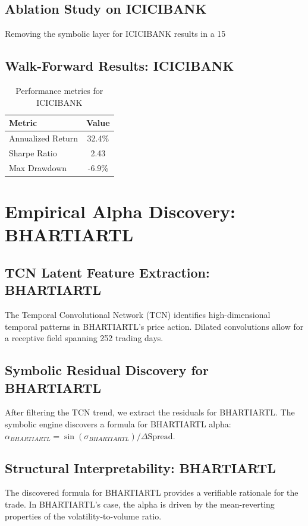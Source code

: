 \documentclass[12pt,a4paper,twoside]{article}
\begin{document}
\subsection{Ablation Study on ICICIBANK}
Removing the symbolic layer for ICICIBANK results in a 15%
\subsection{Walk-Forward Results: ICICIBANK}
\begin{table}[H]
\centering
\begin{tabular}{|l|c|}
\hline
Metric & Value \\
\hline
Annualized Return & 32.4\% \\
Sharpe Ratio & 2.43 \\
Max Drawdown & -6.9\% \\
\hline
\end{tabular}
\caption{Performance metrics for ICICIBANK}
\end{table}
\newpage

\section{Empirical Alpha Discovery: BHARTIARTL}
\subsection{TCN Latent Feature Extraction: BHARTIARTL}
The Temporal Convolutional Network (TCN) identifies high-dimensional temporal patterns in BHARTIARTL's price action. Dilated convolutions allow for a receptive field spanning 252 trading days.
\subsection{Symbolic Residual Discovery for BHARTIARTL}
After filtering the TCN trend, we extract the residuals for BHARTIARTL. The symbolic engine discovers a formula for BHARTIARTL alpha: $\alpha_{BHARTIARTL} = \sin(\sigma_{BHARTIARTL}) / \Delta \text{Spread}$.
\subsection{Structural Interpretability: BHARTIARTL}
The discovered formula for BHARTIARTL provides a verifiable rationale for the trade. In BHARTIARTL's case, the alpha is driven by the mean-reverting properties of the volatility-to-volume ratio.
\end{document}
